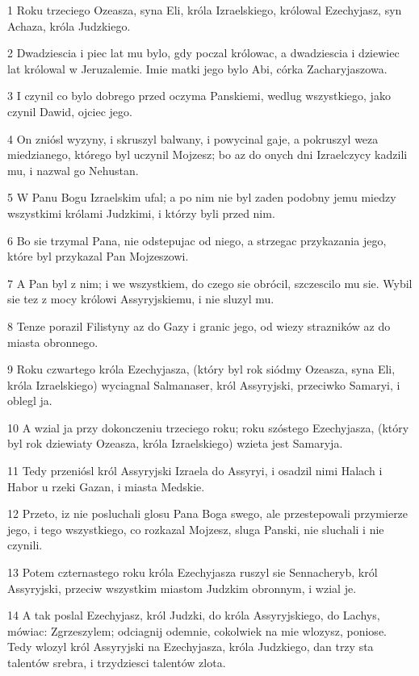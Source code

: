 \par 1 Roku trzeciego Ozeasza, syna Eli, króla Izraelskiego, królowal Ezechyjasz, syn Achaza, króla Judzkiego.
\par 2 Dwadziescia i piec lat mu bylo, gdy poczal królowac, a dwadziescia i dziewiec lat królowal w Jeruzalemie. Imie matki jego bylo Abi, córka Zacharyjaszowa.
\par 3 I czynil co bylo dobrego przed oczyma Panskiemi, wedlug wszystkiego, jako czynil Dawid, ojciec jego.
\par 4 On zniósl wyzyny, i skruszyl balwany, i powycinal gaje, a pokruszyl weza miedzianego, którego byl uczynil Mojzesz; bo az do onych dni Izraelczycy kadzili mu, i nazwal go Nehustan.
\par 5 W Panu Bogu Izraelskim ufal; a po nim nie byl zaden podobny jemu miedzy wszystkimi królami Judzkimi, i którzy byli przed nim.
\par 6 Bo sie trzymal Pana, nie odstepujac od niego, a strzegac przykazania jego, które byl przykazal Pan Mojzeszowi.
\par 7 A Pan byl z nim; i we wszystkiem, do czego sie obrócil, szczescilo mu sie. Wybil sie tez z mocy królowi Assyryjskiemu, i nie sluzyl mu.
\par 8 Tenze porazil Filistyny az do Gazy i granic jego, od wiezy strazników az do miasta obronnego.
\par 9 Roku czwartego króla Ezechyjasza, (który byl rok siódmy Ozeasza, syna Eli, króla Izraelskiego) wyciagnal Salmanaser, król Assyryjski, przeciwko Samaryi, i oblegl ja.
\par 10 A wzial ja przy dokonczeniu trzeciego roku; roku szóstego Ezechyjasza, (który byl rok dziewiaty Ozeasza, króla Izraelskiego) wzieta jest Samaryja.
\par 11 Tedy przeniósl król Assyryjski Izraela do Assyryi, i osadzil nimi Halach i Habor u rzeki Gazan, i miasta Medskie.
\par 12 Przeto, iz nie posluchali glosu Pana Boga swego, ale przestepowali przymierze jego, i tego wszystkiego, co rozkazal Mojzesz, sluga Panski, nie sluchali i nie czynili.
\par 13 Potem czternastego roku króla Ezechyjasza ruszyl sie Sennacheryb, król Assyryjski, przeciw wszystkim miastom Judzkim obronnym, i wzial je.
\par 14 A tak poslal Ezechyjasz, król Judzki, do króla Assyryjskiego, do Lachys, mówiac: Zgrzeszylem; odciagnij odemnie, cokolwiek na mie wlozysz, poniose. Tedy wlozyl król Assyryjski na Ezechyjasza, króla Judzkiego, dan trzy sta talentów srebra, i trzydziesci talentów zlota.
